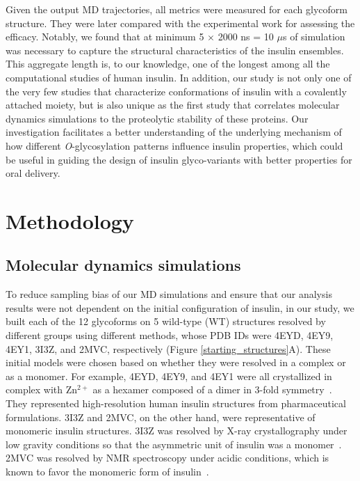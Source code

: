 \documentclass[9pt]{elife}
\begin{document}
Given the output MD trajectories, all metrics were measured for each glycoform structure. They were later compared with the experimental work for assessing the efficacy. Notably, we found that at minimum 5 $\times$ 2000 ns = 10 $\mu$s of simulation was necessary to capture the structural characteristics of the insulin ensembles. This aggregate length is, to our knowledge, one of the longest among all the computational studies of human insulin. In addition, our study is not only one of the very few studies that characterize conformations of insulin with a covalently attached moiety, but is also unique as the first study that correlates molecular dynamics simulations to the proteolytic stability of these proteins. Our investigation facilitates a better understanding of the underlying mechanism of how different \emph{O}-glycosylation patterns influence insulin properties, which could be useful in guiding the design of insulin glyco-variants with better properties for oral delivery.

\section{Methodology}
\subsection{Molecular dynamics simulations}
To reduce sampling bias of our MD simulations and ensure that our analysis results were not dependent on the initial configuration of insulin, in our study, we built each of the 12 glycoforms on 5 wild-type (WT) structures resolved by different groups using different methods, whose PDB IDs were 4EYD, 4EY9, 4EY1, 3I3Z, and 2MVC, respectively (Figure \ref{starting_structures}A). These initial models were chosen based on whether they were resolved in a complex or as a monomer. For example, 4EYD, 4EY9, and 4EY1 were all crystallized in complex with Zn$^{2+}$ as a hexamer composed of a dimer in 3-fold symmetry~\cite{favero2013structural}. They represented high-resolution human insulin structures from pharmaceutical formulations. 3I3Z and 2MVC, on the other hand, were representative of monomeric insulin structures. 3I3Z was resolved by X-ray crystallography under low gravity conditions so that the asymmetric unit of insulin was a monomer~\cite{timofeev2010x}. 2MVC was resolved by NMR spectroscopy under acidic conditions, which is known to favor the monomeric form of insulin~\cite{kvrivzkova2014structural}.
\end{document}
